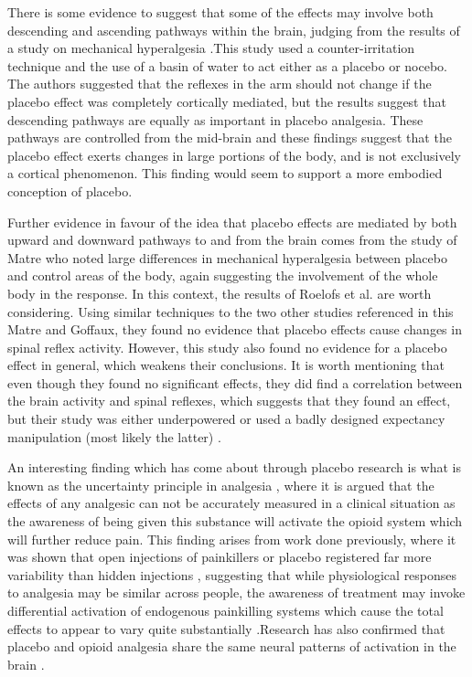 There is some evidence to suggest that some of the effects may involve both descending and ascending pathways within the brain, judging from the results of a study on mechanical hyperalgesia \cite{Goffaux2007}.This study used a counter-irritation technique and the use of a basin of water to act either as a placebo or nocebo. The authors suggested that the reflexes in the arm should not change if the placebo effect was completely cortically mediated, but the results suggest that descending pathways are equally as important in placebo analgesia. These pathways are controlled from the mid-brain and these findings suggest that the placebo effect exerts changes in large portions of the body, and is not exclusively a cortical phenomenon. This finding would seem to support a more embodied conception of placebo.  

Further evidence in favour of the idea that placebo effects are mediated by both upward and downward pathways to and from the brain comes from the study of Matre \cite{Matre2006a} who noted large differences in mechanical hyperalgesia between placebo and control areas of the body, again suggesting the involvement of the whole body in the response. In this context, the results of Roelofs et al. \cite{Roelofs2000} are worth considering. Using similar techniques to the two other studies referenced in this Matre and Goffaux, they found no evidence that placebo effects cause changes in spinal reflex activity. However, this study also found no evidence for a placebo effect in general, which weakens their conclusions. It is worth mentioning that even though they found no significant effects, they did find a correlation between the brain activity and spinal reflexes, which suggests that they found an effect, but their study was either underpowered or used a badly designed expectancy manipulation (most likely the latter) \cite{Goffaux2007}.

An interesting finding which has come about through placebo research is what is known as the uncertainty principle in analgesia \cite{Colloca2005} , where it is argued that the effects of any analgesic can not be accurately measured in a clinical situation as the awareness of being given this substance will activate the opioid system which will further reduce pain. This finding arises from work done previously, where it was shown that open injections of painkillers or placebo registered far more variability than hidden injections \cite{Benedetti2003c}, suggesting that while physiological responses to analgesia may be similar across people, the awareness of treatment may invoke differential activation of endogenous painkilling systems which cause the total effects to appear to vary quite substantially \cite{Amanzio2001} .Research has also confirmed that placebo and opioid analgesia share the same neural patterns of activation in the brain \cite{Petrovic2005}.

